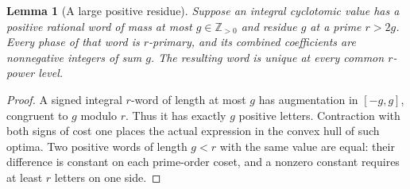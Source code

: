 \documentclass[11pt,a4paper]{article}
\numberwithin{equation}{section}
\newtheorem{lemma}[theorem]{Lemma}
\begin{document}
\begin{lemma}[A large positive residue]\label{word:large-residue}
Suppose an integral cyclotomic value has a positive rational word
of mass at most $g\in\mathbb Z_{>0}$ and residue $g$ at a prime
$r>2g$. Every phase of that word is $r$-primary, and its combined
coefficients are nonnegative integers of sum $g$. The resulting
word is unique at every common $r$-power level.
\end{lemma}
\begin{proof}
A signed integral $r$-word of length at most $g$ has augmentation
in $[-g,g]$, congruent to $g$ modulo $r$. Thus it has exactly
$g$ positive letters. Contraction with both signs of cost one
places the actual expression in the convex hull of such optima.
Two positive words of length $g<r$ with the same value are equal:
their difference is constant on each prime-order coset, and a
nonzero constant requires at least $r$ letters on one side.
\end{proof}
\end{document}
